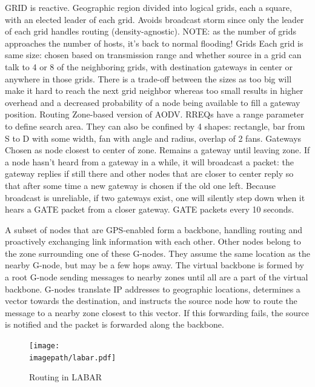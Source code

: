 \documentclass[conference]{IEEEtran}
\newcommand{\imagepath}{../../images/external/location_routing}
\begin{document}
\cite{Liao01grid:a} GRID is reactive.
Geographic region divided into logical grids, each a square, with an elected leader of each grid.
Avoids broadcast storm since only the leader of each grid handles routing (density-agnostic).
NOTE: as the number of grids approaches the number of hosts, it's back to normal flooding!
Grids        
Each grid is same size: chosen based on transmission range and whether source in a grid can talk to 4 or 8 of the neighboring grids, with destination gateways in center or anywhere in those grids.
There is a trade-off between the sizes as too big will make it hard to reach the next grid neighbor whereas too small results in higher overhead and a decreased probability of a node being available to fill a gateway position.
Routing        
Zone-based version of AODV.
RREQs have a range parameter to define search area.
They can also be confined by 4 shapes: rectangle, bar from S to D with some width, fan with angle and radius, overlap of 2 fans.
Gateways        
Chosen as node closest to center of zone.
Remains a gateway until leaving zone.
If a node hasn't heard from a gateway in a while, it will broadcast a packet: the gateway replies if still there and other nodes that are closer to center reply so that after some time a new gateway is chosen if the old one left.
Because broadcast is unreliable, if two gateways exist, one will silently step down when it hears a GATE packet from a closer gateway.
GATE packets every 10 seconds.

\cite{Zaruba2003} A subset of nodes that are GPS-enabled form a backbone, handling routing and proactively exchanging link information with each other.
Other nodes belong to the zone surrounding one of these G-nodes.
They assume the same location as the nearby G-node, but may be a few hops away.
The virtual backbone is formed by a root G-node sending messages to nearby zones until all are a part of the virtual backbone.
G-nodes translate IP addresses to geographic locations, determines a vector towards the destination, and instructs the source node how to route the message to a nearby zone closest to this vector.
If this forwarding fails, the source is notified and the packet is forwarded along the backbone.

\begin{figure}
\label{fig:labar-routing}
\centering
\texttt{[image: \\imagepath/labar.pdf]}
\caption{Routing in LABAR}
\end{figure}
\end{document}
